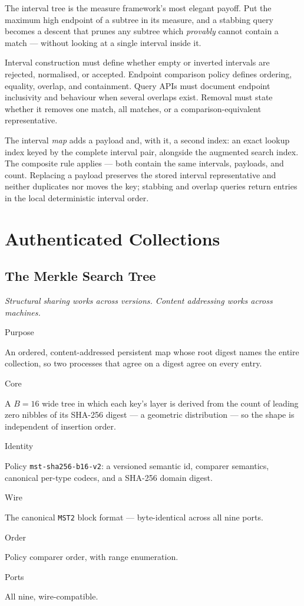 \documentclass[11pt,twoside,openright]{book}
\newcommand{\code}[1]{\texorpdfstring{\textcolor{d7ink}{\texttt{#1}}}{#1}}
\newcommand{\motto}[1]{%
  \begingroup
  \vspace{-4pt}\hfill\begin{minipage}{0.80\textwidth}
    \raggedleft\itshape\color{d7slate}\small #1\par
  \end{minipage}\par\vspace{18pt}
  \endgroup}
\newcommand{\spec}[2]{%
  \par\noindent
  \parbox[t]{0.21\linewidth}{\raggedright\sffamily\bfseries\footnotesize
    \color{d7slate}\strut #1}%
  \hspace{9pt}%
  \parbox[t]{\dimexpr0.79\linewidth-9pt\relax}{\raggedright\strut #2}%
  \par\vspace{3.5pt}}
\newenvironment{specimen}[1][Specimen]
  {\begin{glancebox}[#1]\small\setlength{\parindent}{0pt}}
  {\end{glancebox}}
\begin{document}
\noindent
The interval tree is the measure framework's most elegant payoff. Put the
maximum high endpoint of a subtree in its measure, and a stabbing query becomes
a descent that prunes any subtree which \emph{provably} cannot contain a match ---
without looking at a single interval inside it.

\begin{contractbox}
Interval construction must define whether empty or inverted intervals are
rejected, normalised, or accepted. Endpoint comparison policy defines ordering,
equality, overlap, and containment. Query APIs must document endpoint
inclusivity and behaviour when several overlaps exist. Removal must state whether
it removes one match, all matches, or a comparison-equivalent representative.
\end{contractbox}

The interval \emph{map} adds a payload and, with it, a second index: an exact
lookup index keyed by the complete interval pair, alongside the augmented search
index. The composite rule applies --- both contain the same intervals, payloads,
and count. Replacing a payload preserves the stored interval representative and
neither duplicates nor moves the key; stabbing and overlap queries return entries
in the local deterministic interval order.

\part{Authenticated Collections}
\label{part:authenticated}

\chapter{The Merkle Search Tree}
\label{ch:mst}

\motto{Structural sharing works across versions. Content addressing works across
machines.}

\begin{specimen}[Specimen --- \code{MerkleSearchTree}]
\spec{Purpose}{An ordered, content-addressed persistent map whose root digest names the entire collection, so two processes that agree on a digest agree on every entry.}
\spec{Core}{A $B=16$ wide tree in which each key's layer is derived from the count of leading zero nibbles of its SHA-256 digest --- a geometric distribution --- so the shape is independent of insertion order.}
\spec{Identity}{Policy \code{mst-sha256-b16-v2}: a versioned semantic id, comparer semantics, canonical per-type codecs, and a SHA-256 domain digest.}
\spec{Wire}{The canonical \code{MST2} block format --- byte-identical across all nine ports.}
\spec{Order}{Policy comparer order, with range enumeration.}
\spec{Ports}{All nine, wire-compatible.}
\end{specimen}
\end{document}
